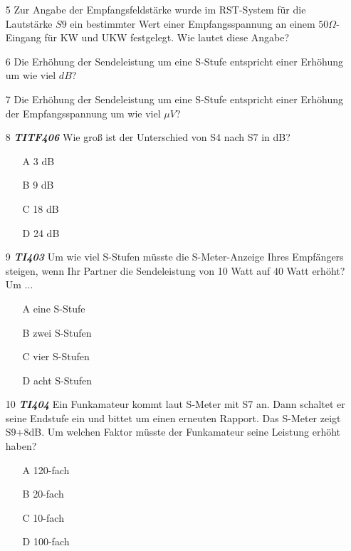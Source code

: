 \begin{enumerate} 
\itemsep1pt\parskip0pt
\item[5] Zur Angabe der Empfangsfeldstärke wurde im RST-System für die Lautstärke $S9$ ein bestimmter Wert einer Empfangsspannung an einem $50\Omega$-Eingang für KW und UKW festgelegt. Wie lautet diese Angabe?
\item[6] Die Erhöhung der Sendeleistung um eine S-Stufe entspricht einer Erhöhung um wie viel $dB$?
\item[7] Die Erhöhung der Sendeleistung um eine S-Stufe entspricht einer Erhöhung der Empfangsspannung um wie viel $\mu V$?
\item[8] \emph{\textbf{TITF406}} Wie groß ist der Unterschied von S4 nach S7 in dB?
	\begin{enumerate}
	\itemsep1pt\parskip0pt
		\item[A] 3 dB
		\item[B] 9 dB
		\item[C] 18 dB
		\item[D] 24 dB
	\end{enumerate}
\item[9] \emph{\textbf{TI403}} Um wie viel S-Stufen müsste die S-Meter-Anzeige Ihres Empfängers steigen, wenn Ihr Partner die Sendeleistung von 10 Watt auf 40 Watt erhöht? Um ...
	\begin{enumerate}
	\itemsep1pt\parskip0pt
		\item[A] eine S-Stufe
		\item[B] zwei S-Stufen
		\item[C] vier S-Stufen
		\item[D] acht S-Stufen
	\end{enumerate}
\item[10] \emph{\textbf{TI404}} Ein Funkamateur kommt laut S-Meter mit S7 an. Dann schaltet er seine Endstufe ein und bittet um einen erneuten Rapport. Das S-Meter zeigt S9+8dB. Um welchen Faktor müsste der Funkamateur seine Leistung erhöht haben?
	\begin{enumerate}
	\itemsep1pt\parskip0pt
		\item[A] 120-fach
		\item[B] 20-fach 
		\item[C] 10-fach
		\item[D] 100-fach
	\end{enumerate}
\end{enumerate}

